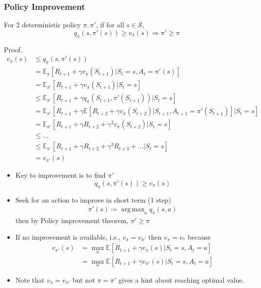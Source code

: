 \documentclass[10pt]{beamer}
\DeclareMathOperator*{\argmax}{arg\,max}
\theoremstyle{remark}
\begin{document}
\begin{frame}
    \frametitle{Policy Improvement}
    \begin{theorem}
        For 2 deterministic policy $\pi, \pi'$,  if for all $s \in \mathcal{S}$,
         \[
             q_\pi(s, \pi'(s)) \geq v_\pi(s) \Rightarrow \pi' \geq \pi
        \] 
    \end{theorem}
    Proof.
    \begin{align*}
        v_\pi(s) 
        &\leq q_\pi(s, \pi'(s)) \\
        &= \mathbb{E}_\pi \left[ R_{t+1} + \gamma v_\pi(S_{t+1}) | S_t = s, A_t = \pi'(s) \right] \\
        &= \mathbb{E}_{\pi'} \left[ R_{t+1} + \gamma v_\pi(S_{t+1}) | S_t = s \right] \\
        &\leq \mathbb{E}_{\pi'} \left[ R_{t+1} + \gamma q_\pi(S_{t+1}, \pi'(S_{t+1})) | S_t = s \right] \\
        &= \mathbb{E}_{\pi'} \left[ R_{t+1} + \gamma \mathbb{E}\left[ R_{t+2} + \gamma v_\pi(S_{t+2})| S_{t+1}, A_{t+1} = \pi'(S_{t+1}) \right] | S_t = s \right] \\
        &= \mathbb{E}_{\pi'} \left[ R_{t+1} + \gamma R_{t+2} + \gamma^2 v_\pi(S_{t+2}) | S_t = s \right] \\
        &\leq \ldots  \\
        &\leq \mathbb{E}_{\pi'} \left[ R_{t+1} + \gamma R_{t+2} + \gamma^{3}R_{t+3} + \ldots | S_t = s \right] \\
        &= v_{\pi'}(s)
    \end{align*}
\end{frame}

\begin{frame}
    \begin{itemize}
        \item Key to improvement is to find $\pi'$
    \begin{equation}
        q_\pi(s, \pi'(s)) \geq v_\pi(s)
    \end{equation} 
    \item Seek for an action to improve in short term (1 step)
    \begin{align*}
        \pi'(s) \coloneqq \argmax_{a} q_\pi(s, a)
    \end{align*}
    then by Policy improvement theorem, $\pi' \geq \pi$
    
\item If no improvement is available, i.e., $v_\pi = v_{\pi'}$ then $v_\pi = v_\ast$ because
    \begin{align*}
        v_{\pi'}(s) 
        &= \max_{a} \mathbb{E}[R_{t+1} + \gamma v_{\pi} (s) |S_t = s, A_t=a] \\
        &= \max_{a} \mathbb{E}[R_{t+1} + \gamma v_{\pi'} (s) |S_t = s, A_t=a]
    \end{align*}
    
\item Note that $v_\pi = v_{\pi'}$  but not $\pi = \pi'$ gives a hint about reaching optimal value.
    \end{itemize}
\end{frame}
\end{document}
